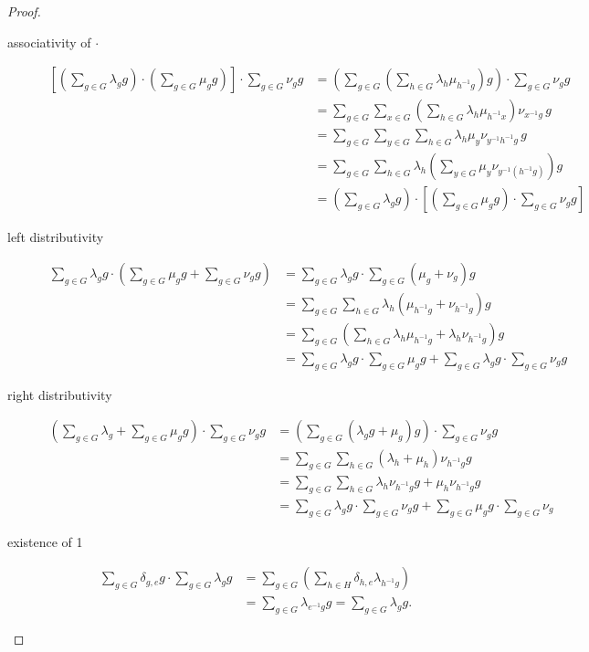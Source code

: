 \documentclass[titlepage, a4paper]{article}
\theoremstyle{remark}
\begin{document}
\begin{proof}
\begin{description}
		\item[associativity of $\cdot$]
		\begin{align*}
		\left[\left(\sum_{g \in G} \lambda_g g \right) \cdot \left(\sum_{g \in G} \mu_g g \right)\right ] \cdot \sum_{g \in G} \nu_g g
		&= \left(\sum_{g \in G} \left( \sum_{h \in G} \lambda_{h} \mu_{h^{-1}g} \right) g \right) \cdot \sum_{g \in G} \nu_g g\\
		&= \sum_{g \in G} \sum_{x \in G} \left( \sum_{h \in G} \lambda_{h} \mu_{h^{-1}x} \right) \nu_{x^{-1}g} \,g \\
		&= \sum_{g \in G} \sum_{y \in G} \sum_{h \in G} \lambda_{h} \mu_{y} \nu_{y^{-1} h^{-1}g} \, g \\
		&= \sum_{g \in G} \sum_{h \in G} \lambda_h \left(\sum_{y \in G}\mu_{y} \nu_{y^{-1} (h^{-1}g)}\right)g \\
		&= \left(\sum_{g \in G} \lambda_g g \right) \cdot \left[ \left(\sum_{g \in G} \mu_g g \right) \cdot \sum_{g \in G} \nu_g g \right]
		\end{align*}
	
		\item[left distributivity]
		\begin{align*}
		\sum_{g \in G} \lambda_g g \cdot \left(\sum_{g \in G} \mu_g g + \sum_{g \in G} \nu_g g \right) 
		&= \sum_{g \in G} \lambda_g g \cdot \sum_{g \in G} (\mu_g + \nu_g) g \\
		&= \sum_{g \in G} \sum_{h \in G} \lambda_h (\mu_{h^{-1}g} + \nu_{h^{-1}g}) g \\
		&= \sum_{g \in G} \left(\sum_{h \in G} \lambda_h \mu_{h^{-1}g} + \lambda_h \nu_{h^{-1}g}\right) g \\
		&= \sum_{g \in G} \lambda_g g \cdot \sum_{g \in G} \mu_g g
			+ \sum_{g \in G} \lambda_g g \cdot \sum_{g \in G} \nu_g g
		\end{align*}
	
		\item[right distributivity]
		\begin{align*}
		\left(\sum_{g \in G} \lambda_g + \sum_{g \in G} \mu_g g\right) \cdot \sum_{g \in G} \nu_g g
		&= \left(\sum_{g \in G} (\lambda_g g + \mu_g) g\right) \cdot \sum_{g \in G} \nu_g g\\
		&= \sum_{g \in G} \sum_{h \in G} (\lambda_h + \mu_h) \nu_{h^{-1}g} g \\
		&= \sum_{g \in G} \sum_{h \in G} \lambda_h \nu_{h^{-1}g} g + \mu_h \nu_{h^{-1}g} g \\
		&= \sum_{g \in G} \lambda_g g \cdot \sum_{g \in G} \nu_g g + \sum_{g \in G} \mu_g g \cdot \sum_{g \in G} \nu_g 
		\end{align*}
	
		\item[existence of 1]
		\begin{align*}
		\sum_{g \in G} \delta_{g,e} g \cdot \sum_{g \in G} \lambda_g g
		&= \sum_{g \in G} \left(\sum_{h \in H} \delta_{h,e} \lambda_{h^{-1}g} \right) \\
		&= \sum_{g \in G} \lambda_{e^{-1}g} g = \sum_{g \in G} \lambda_g g.
		\end{align*}
		
		\end{description}
        \end{proof}
\end{document}

